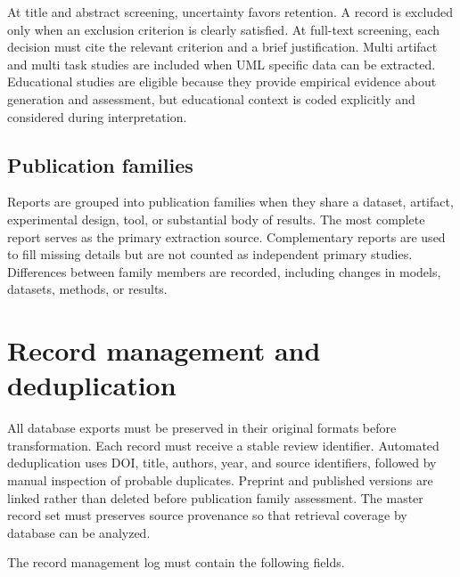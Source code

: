 At title and abstract screening, uncertainty favors retention. A record is excluded only when an exclusion criterion is clearly satisfied. At full-text screening, each decision must cite the relevant criterion and a brief justification. Multi artifact and multi task studies are included when UML specific data can be extracted. Educational studies are eligible because they provide empirical evidence about generation and assessment, but educational context is coded explicitly and considered during interpretation.

\subsection{Publication families}

Reports are grouped into publication families when they share a dataset, artifact, experimental design, tool, or substantial body of results. The most complete report serves as the primary extraction source. Complementary reports are used to fill missing details but are not counted as independent primary studies. Differences between family members are recorded, including changes in models, datasets, methods, or results.

\section{Record management and deduplication}
\label{sec:protocol_records}

All database exports must be preserved in their original formats before transformation. Each record must receive a stable review identifier. Automated deduplication uses DOI, title, authors, year, and source identifiers, followed by manual inspection of probable duplicates. Preprint and published versions are linked rather than deleted before publication family assessment. The master record set must preserves source provenance so that retrieval coverage by database can be analyzed.

The record management log must contain the following fields.

